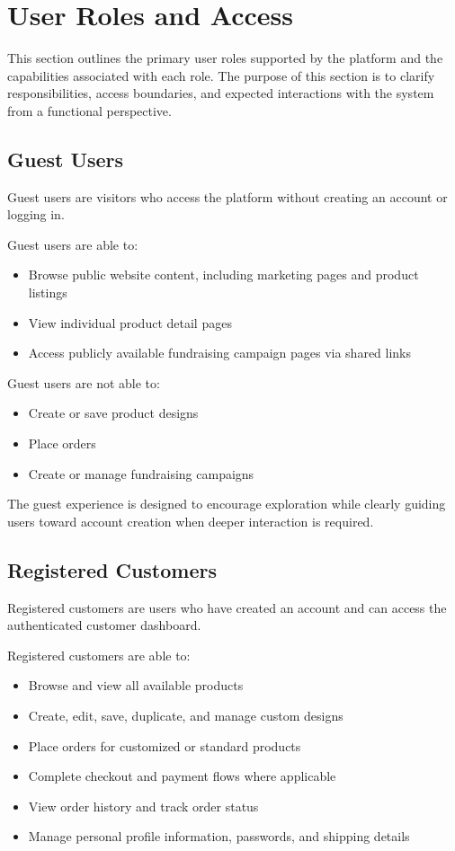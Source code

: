 \section{User Roles and Access}

This section outlines the primary user roles supported by the platform and the
capabilities associated with each role. The purpose of this section is to clarify
responsibilities, access boundaries, and expected interactions with the system
from a functional perspective.

\subsection{Guest Users}

Guest users are visitors who access the platform without creating an account or
logging in.

Guest users are able to:
\begin{itemize}[leftmargin=1.5em]
    \item Browse public website content, including marketing pages and product
    listings
    \item View individual product detail pages
    \item Access publicly available fundraising campaign pages via shared links
\end{itemize}

Guest users are not able to:
\begin{itemize}[leftmargin=1.5em]
    \item Create or save product designs
    \item Place orders
    \item Create or manage fundraising campaigns
\end{itemize}

The guest experience is designed to encourage exploration while clearly guiding
users toward account creation when deeper interaction is required.

\subsection{Registered Customers}

Registered customers are users who have created an account and can access the
authenticated customer dashboard.

Registered customers are able to:
\begin{itemize}[leftmargin=1.5em]
    \item Browse and view all available products
    \item Create, edit, save, duplicate, and manage custom designs
    \item Place orders for customized or standard products
    \item Complete checkout and payment flows where applicable
    \item View order history and track order status
    \item Manage personal profile information, passwords, and shipping details
\end{itemize}

